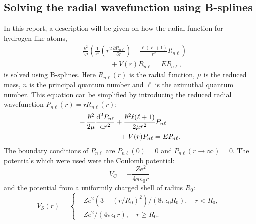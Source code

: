 \documentclass[twocolumn]{article}
\begin{document}
\begin{large}
\section*{Solving the radial wavefunction using B-splines}
In this report, a description will be given on how the radial function for hydrogen-like atoms,
\begin{equation}
    \label{27apr1633}
    \begin{split}
        &-\frac{\hbar^2}{2\mu}\left(\frac{1}{r^2}\left(r^2\frac{\partial R_{n\ell}}{\partial r}\right)-\frac{\ell(\ell+1)}{r^2}R_{n\ell}\right) \\ 
        &\hspace{2cm} +V(r)R_{n\ell} = ER_{n\ell},
    \end{split}
\end{equation}
is solved using B-splines. Here $R_{n\ell}(r)$ is the radial function, $\mu$ is the reduced mass, $n$ is the principal quantum number and $\ell$ is the azimuthal quantum number. This equation can be simplified by introducing the reduced radial wavefunction $P_{n\ell}(r) = rR_{n\ell}(r)$:
\begin{equation}
    \label{26apr0749}
    \begin{split}
        &-\frac{\hbar^2}{2\mu}\frac{\text{d}^2P_{n\ell}}{\text{d}r^2} + \frac{\hbar^2\ell(\ell+1)}{2\mu r^2}P_{n\ell} \\ 
        &\hspace{2.1cm} + V(r)P_{n\ell} = EP_{n\ell}.
    \end{split}
\end{equation}
The boundary conditions of $P_{n\ell}$ are $P_{n\ell}(0) = 0$ and $P_{n\ell}(r\to\infty) = 0$. The potentials which were used were the Coulomb potential:
\begin{equation}
    V_C = -\frac{Ze^2}{4\pi\epsilon_0r}
\end{equation}
and the potential from a  uniformily charged shell of radius $R_0$:
\begin{equation}
    V_S(r) = 
    \begin{cases}
        -Ze^2(3-(r/R_0)^2)/(8\pi\epsilon_0R_0), \quad r<R_0, \\ 
        -Ze^2/(4\pi\epsilon_0r), \quad r\geq R_0.
    \end{cases}
\end{equation}


\end{large}
\end{document}
